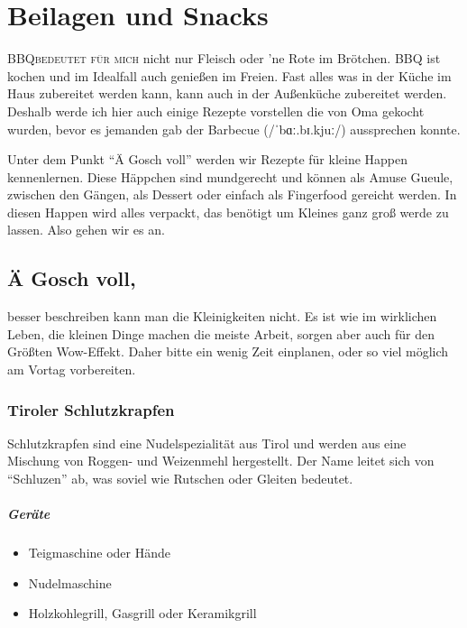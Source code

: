\chapter{Beilagen und Snacks}\label{Chapter4}
\lettrine[lines=3]{BBQ}{bedeutet für mich} nicht nur Fleisch oder 'ne Rote im Brötchen. BBQ ist kochen und im Idealfall auch genießen im 
Freien. Fast alles was in der Küche im Haus zubereitet werden kann, kann auch in der Außenküche zubereitet werden.  Deshalb werde ich 
hier auch einige Rezepte vorstellen die von Oma gekocht wurden, bevor es jemanden gab der Barbecue (/ˈbɑː.bɪ.kjuː/)  aussprechen konnte.

Unter dem Punkt "`Ä Gosch voll"' werden wir Rezepte für kleine Happen kennenlernen.  Diese Häppchen sind mundgerecht und können als Amuse Gueule, 
zwischen den Gängen, als Dessert oder einfach als Fingerfood gereicht werden. In diesen Happen wird alles verpackt, das benötigt um Kleines ganz groß werde zu 
lassen. Also gehen wir es an.  

\section{Ä Gosch voll,}
besser beschreiben kann man die Kleinigkeiten nicht. Es ist wie im wirklichen Leben, die kleinen Dinge machen die meiste Arbeit, sorgen aber auch für den Größten 
Wow-Effekt. Daher bitte ein wenig Zeit einplanen, oder so viel möglich am Vortag vorbereiten. 

\subsection{Tiroler Schlutzkrapfen}

Schlutzkrapfen sind eine Nudelspezialität aus Tirol und werden aus eine Mischung von Roggen- und Weizenmehl hergestellt. Der Name leitet sich von "`Schluzen"' 
ab, was soviel wie Rutschen oder Gleiten bedeutet.

\paragraph{Geräte}

\begin{itemize}[noitemsep]
	\item Teigmaschine oder Hände
	\item Nudelmaschine
	\item Holzkohlegrill, Gasgrill oder Keramikgrill
\end{itemize}

